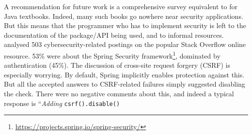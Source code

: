 \documentclass[conference]{IEEEtran}
\begin{document}
A recommendation for future work is a comprehensive survey equivalent to \cite{Drop2019} for  Java textbooks. Indeed, many such books go nowhere near security applications.  But this means that the programmer who has to implement security is left to the documentation of the package/API being used, and to informal resources. \cite{Mengetal2018a} analysed 503 cybersecurity-related postings on the popular Stack Overflow online resource.  53\% were about the Spring Security framework\footnote{\url{https://projects.spring.io/spring-security/}}, dominated by authentication (45\%). The discussion \cite[\S4.3.1]{Mengetal2018a} of cross-site request forgery (CSRF) is especially worrying.  By default, Spring implicitly enables protection against this. But all the accepted answers to CSRF-related failures simply suggested disabling the check. There were no negative comments about this, and indeed a typical response is ``{\emph{Adding}} \verb!csrf().disable()!
\end{document}
